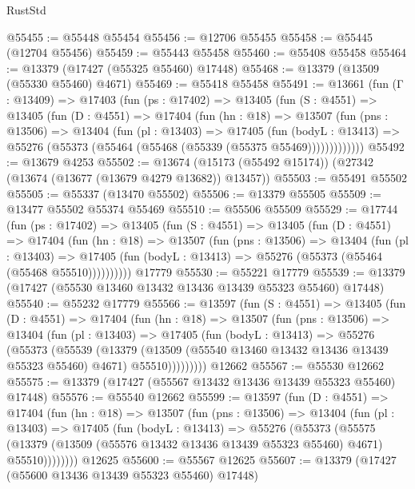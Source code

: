 \begin{lexlean}{RustStd}
\begin{coremodule}
@55455 := @55448 @55454
@55456 := @12706 @55455
@55458 := @55445 (@12704 @55456)
@55459 := @55443 @55458
@55460 := @55408 @55458
@55464 := @13379 (@17427 (@55325 @55460) @17448)
@55468 := @13379 (@13509 (@55330 @55460) @4671)
@55469 := @55418 @55458
@55491 := @13661
    (fun (Γ : @13409) =>
    @17403
      (fun (ps : @17402) =>
      @13405
        (fun (S : @4551) =>
        @13405
          (fun (D : @4551) =>
          @17404
            (fun (hn : @18) =>
            @13507
              (fun (pns : @13506) =>
              @13404
                (fun (pl : @13403) =>
                @17405
                  (fun (bodyL : @13413) =>
                  @55276 (@55373 (@55464 (@55468 (@55339 (@55375 @55469)))))))))))))
@55492 := @13679 @4253
@55502 := @13674 (@15173 (@55492 @15174)) (@27342 (@13674 (@13677 (@13679 @4279 @13682)) @13457))
@55503 := @55491 @55502
@55505 := @55337 (@13470 @55502)
@55506 := @13379 @55505
@55509 := @13477 @55502 @55374 @55469
@55510 := @55506 @55509
@55529 := @17744
    (fun (ps : @17402) =>
    @13405
      (fun (S : @4551) =>
      @13405
        (fun (D : @4551) =>
        @17404
          (fun (hn : @18) =>
          @13507
            (fun (pns : @13506) =>
            @13404
              (fun (pl : @13403) =>
              @17405 (fun (bodyL : @13413) => @55276 (@55373 (@55464 (@55468 @55510))))))))))
    @17779
@55530 := @55221 @17779
@55539 := @13379 (@17427 (@55530 @13460 @13432 @13436 @13439 @55323 @55460) @17448)
@55540 := @55232 @17779
@55566 := @13597
    (fun (S : @4551) =>
    @13405
      (fun (D : @4551) =>
      @17404
        (fun (hn : @18) =>
        @13507
          (fun (pns : @13506) =>
          @13404
            (fun (pl : @13403) =>
            @17405
              (fun (bodyL : @13413) =>
              @55276
                (@55373
                  (@55539
                    (@13379
                      (@13509 (@55540 @13460 @13432 @13436 @13439 @55323 @55460) @4671)
                      @55510)))))))))
    @12662
@55567 := @55530 @12662
@55575 := @13379 (@17427 (@55567 @13432 @13436 @13439 @55323 @55460) @17448)
@55576 := @55540 @12662
@55599 := @13597
    (fun (D : @4551) =>
    @17404
      (fun (hn : @18) =>
      @13507
        (fun (pns : @13506) =>
        @13404
          (fun (pl : @13403) =>
          @17405
            (fun (bodyL : @13413) =>
            @55276
              (@55373
                (@55575
                  (@13379 (@13509 (@55576 @13432 @13436 @13439 @55323 @55460) @4671) @55510))))))))
    @12625
@55600 := @55567 @12625
@55607 := @13379 (@17427 (@55600 @13436 @13439 @55323 @55460) @17448)

\end{coremodule}
\end{lexlean}
